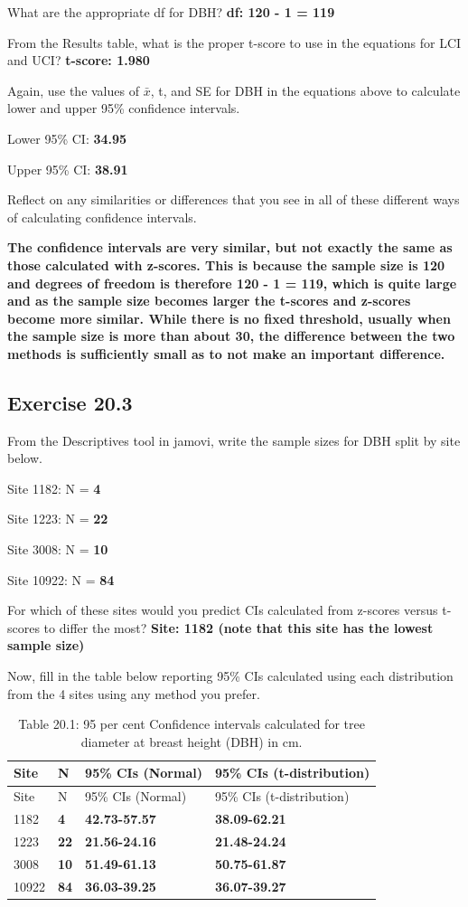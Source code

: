 \documentclass[
  openany]{krantz}
\begin{document}
What are the appropriate df for DBH? \textbf{df: 120 - 1 = 119}

From the Results table, what is the proper t-score to use in the equations for LCI and UCI? \textbf{t-score: 1.980}

Again, use the values of \(\bar{x}\), t, and SE for DBH in the equations above to calculate lower and upper 95\% confidence intervals.

Lower 95\% CI: \textbf{34.95}

Upper 95\% CI: \textbf{38.91}

Reflect on any similarities or differences that you see in all of these different ways of calculating confidence intervals.

\textbf{The confidence intervals are very similar, but not exactly the same as those calculated with z-scores. This is because the sample size is 120 and degrees of freedom is therefore 120 - 1 = 119, which is quite large and as the sample size becomes larger the t-scores and z-scores become more similar. While there is no fixed threshold, usually when the sample size is more than about 30, the difference between the two methods is sufficiently small as to not make an important difference.}

\hypertarget{exercise-20.3}{%
\subsection{Exercise 20.3}\label{exercise-20.3}}

From the Descriptives tool in jamovi, write the sample sizes for DBH split by site below.

Site 1182: N = \textbf{4}

Site 1223: N = \textbf{22}

Site 3008: N = \textbf{10}

Site 10922: N = \textbf{84}

For which of these sites would you predict CIs calculated from z-scores versus t- scores to differ the most? \textbf{Site: 1182 (note that this site has the lowest sample size)}

Now, fill in the table below reporting 95\% CIs calculated using each distribution from the 4 sites using any method you prefer.

\begin{longtable}[]{@{}llll@{}}
\caption{Table 20.1: 95 per cent Confidence intervals calculated for tree diameter at breast height (DBH) in cm.}\tabularnewline
\toprule
Site & N & 95\% CIs (Normal) & 95\% CIs (t-distribution) \\
\midrule
\endfirsthead
\toprule
Site & N & 95\% CIs (Normal) & 95\% CIs (t-distribution) \\
\midrule
\endhead
1182 & \textbf{4} & \textbf{42.73-57.57} & \textbf{38.09-62.21} \\
1223 & \textbf{22} & \textbf{21.56-24.16} & \textbf{21.48-24.24} \\
3008 & \textbf{10} & \textbf{51.49-61.13} & \textbf{50.75-61.87} \\
10922 & \textbf{84} & \textbf{36.03-39.25} & \textbf{36.07-39.27} \\
\bottomrule
\end{longtable}
\end{document}
